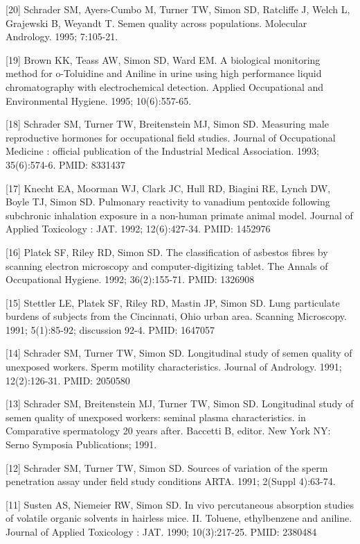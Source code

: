 \documentclass[
  12pt,
]{article}
\begin{document}
{[}20{]} Schrader SM, Ayers-Cumbo M, Turner TW, Simon SD, Ratcliffe J,
Welch L, Grajewski B, Weyandt T. Semen quality across populations.
Molecular Andrology. 1995; 7:105-21.

{[}19{]} Brown KK, Teass AW, Simon SD, Ward EM. A biological monitoring
method for o-Toluidine and Aniline in urine using high performance
liquid chromatography with electrochemical detection. Applied
Occupational and Environmental Hygiene. 1995; 10(6):557-65.

{[}18{]} Schrader SM, Turner TW, Breitenstein MJ, Simon SD. Measuring
male reproductive hormones for occupational field studies. Journal of
Occupational Medicine : official publication of the Industrial Medical
Association. 1993; 35(6):574-6. PMID: 8331437

{[}17{]} Knecht EA, Moorman WJ, Clark JC, Hull RD, Biagini RE, Lynch DW,
Boyle TJ, Simon SD. Pulmonary reactivity to vanadium pentoxide following
subchronic inhalation exposure in a non-human primate animal model.
Journal of Applied Toxicology : JAT. 1992; 12(6):427-34. PMID: 1452976

{[}16{]} Platek SF, Riley RD, Simon SD. The classification of asbestos
fibres by scanning electron microscopy and computer-digitizing tablet.
The Annals of Occupational Hygiene. 1992; 36(2):155-71. PMID: 1326908

{[}15{]} Stettler LE, Platek SF, Riley RD, Mastin JP, Simon SD. Lung
particulate burdens of subjects from the Cincinnati, Ohio urban area.
Scanning Microscopy. 1991; 5(1):85-92; discussion 92-4. PMID: 1647057

{[}14{]} Schrader SM, Turner TW, Simon SD. Longitudinal study of semen
quality of unexposed workers. Sperm motility characteristics. Journal of
Andrology. 1991; 12(2):126-31. PMID: 2050580

{[}13{]} Schrader SM, Breitenstein MJ, Turner TW, Simon SD. Longitudinal
study of semen quality of unexposed workers: seminal plasma
characteristics. in Comparative spermatology 20 years after. Baccetti B,
editor. New York NY: Serno Symposia Publications; 1991.

{[}12{]} Schrader SM, Turner TW, Simon SD. Sources of variation of the
sperm penetration assay under field study conditions ARTA. 1991; 2(Suppl
4):63-74.

{[}11{]} Susten AS, Niemeier RW, Simon SD. In vivo percutaneous
absorption studies of volatile organic solvents in hairless mice. II.
Toluene, ethylbenzene and aniline. Journal of Applied Toxicology : JAT.
1990; 10(3):217-25. PMID: 2380484
\end{document}
